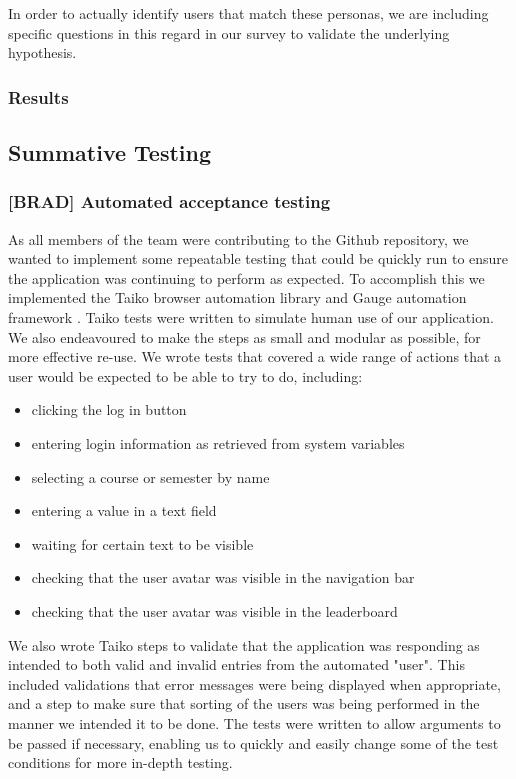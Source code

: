 In order to actually identify users that match these personas, we are including specific questions in this regard in our survey to validate the underlying hypothesis.

\subsubsection{Results}

\subsection{Summative Testing}\label{sec:summative}
\subsubsection{[BRAD] Automated acceptance testing}\label{sec:autotest}

As all members of the team were contributing to the Github repository, we wanted to implement some repeatable testing that could be quickly run to ensure the application was continuing to perform as expected. To accomplish this we implemented the Taiko browser automation library \cite{taiko} and Gauge automation framework \cite{gauge}.
Taiko tests were written to simulate human use of our application. We also endeavoured to make the steps as small and modular as possible, for more effective re-use. We wrote tests that covered a wide range of actions that a user would be expected to be able to try to do, including:

\begin{itemize}
	\item clicking the log in button
	\item entering login information as retrieved from system variables
	\item selecting a course or semester by name
	\item entering a value in a text field
	\item waiting for certain text to be visible
	\item checking that the user avatar was visible in the navigation bar
	\item checking that the user avatar was visible in the leaderboard
\end{itemize}

We also wrote Taiko steps to validate that the application was responding as intended to both valid and invalid entries from the automated "user". This included validations that error messages were being displayed when appropriate, and a step to make sure that sorting of the users was being performed in the manner we intended it to be done. The tests were written to allow arguments to be passed if necessary, enabling us to quickly and easily change some of the test conditions for more in-depth testing.

